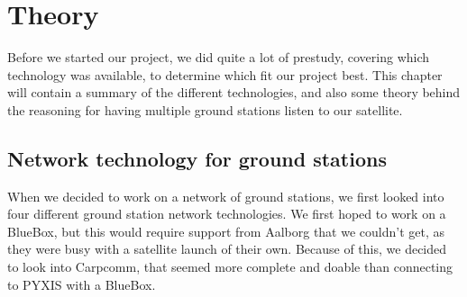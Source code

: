 \chapter{Theory}
Before we started our project, we did quite a lot of prestudy, covering which technology was available, to determine which fit our project best. This chapter will contain a summary of the different technologies, and also some theory behind the reasoning for having multiple ground stations listen to our satellite.

\section{Network technology for ground stations}
When we decided to work on a network of ground stations, we first looked into four different ground station network technologies. We first hoped to work on a BlueBox, but this would require support from Aalborg that we couldn't get, as they were busy with a satellite launch of their own. Because of this, we decided to look into Carpcomm, that seemed more complete and doable than connecting to PYXIS with a BlueBox.







